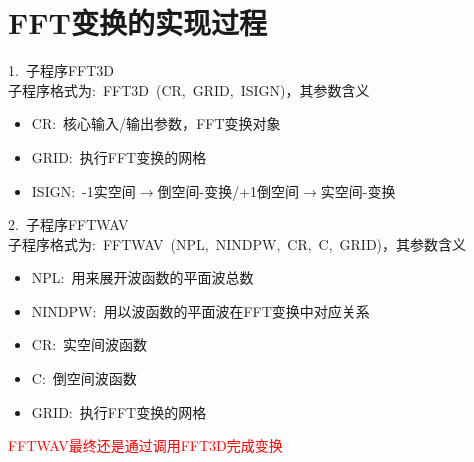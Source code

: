 \section{\rm{FFT}变换的实现过程}\label{label:Section-1}
1.~子程序\textrm{FFT3D}\\
子程序格式为:~\textrm{FFT3D~(CR,~GRID,~ISIGN)}，其参数含义\\
\begin{itemize}
	\item \textrm{CR}:~核心输入/输出参数，\textrm{FFT}变换对象
	\item \textrm{GRID}:~执行\textrm{FFT}变换的网格
	\item \textrm{ISIGN}:~-1实空间$\rightarrow$倒空间-变换/+1倒空间$\rightarrow$实空间-变换
\end{itemize}
\textrm{}

2.~子程序\textrm{FFTWAV}\\
子程序格式为:~\textrm{FFTWAV~(NPL,~NINDPW,~CR,~C,~GRID)}，其参数含义\\
\begin{itemize}
	\item \textrm{NPL}:~用来展开波函数的平面波总数
	\item \textrm{NINDPW}:~用以波函数的平面波在\textrm{FFT}变换中对应关系
	\item \textrm{CR}:~实空间波函数
	\item \textrm{C}:~倒空间波函数
	\item \textrm{GRID}:~执行\textrm{FFT}变换的网格
\end{itemize}
\textcolor{red}{\textrm{FFTWAV}最终还是通过调用\textrm{FFT3D}完成变换}

